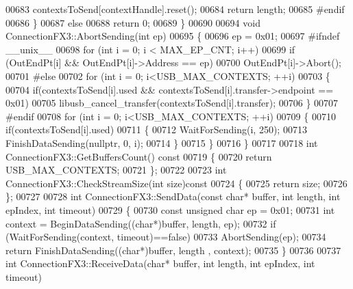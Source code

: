 \begin{DoxyCode}
{{{{00683         contextsToSend[contextHandle].reset();
00684     \textcolor{keywordflow}{return} length;
00685 \textcolor{preprocessor}{#endif}
00686     \}
00687     \textcolor{keywordflow}{else}
00688         \textcolor{keywordflow}{return} 0;
00689 \}
00690 
00694 \textcolor{keywordtype}{void} ConnectionFX3::AbortSending(\textcolor{keywordtype}{int} ep)
00695 \{
00696     ep = 0x01;
00697 \textcolor{preprocessor}{#ifndef \_\_unix\_\_}
00698     \textcolor{keywordflow}{for} (\textcolor{keywordtype}{int} i = 0; i < MAX\_EP\_CNT; i++)
00699         \textcolor{keywordflow}{if} (OutEndPt[i] && OutEndPt[i]->Address == ep)
00700             OutEndPt[i]->Abort();
00701 \textcolor{preprocessor}{#else}
00702     \textcolor{keywordflow}{for} (\textcolor{keywordtype}{int} i = 0; i<USB\_MAX\_CONTEXTS; ++i)
00703     \{
00704         \textcolor{keywordflow}{if}(contextsToSend[i].used && contextsToSend[i].transfer->endpoint == 0x01)
00705             libusb\_cancel\_transfer(contextsToSend[i].transfer);
00706     \}
00707 \textcolor{preprocessor}{#endif}
00708     \textcolor{keywordflow}{for} (\textcolor{keywordtype}{int} i = 0; i<USB\_MAX\_CONTEXTS; ++i)
00709     \{
00710         \textcolor{keywordflow}{if}(contextsToSend[i].used)
00711         \{
00712             WaitForSending(i, 250);
00713             FinishDataSending(\textcolor{keyword}{nullptr}, 0, i);
00714         \}
00715     \}
00716 \}
00717 
00718 \textcolor{keywordtype}{int} ConnectionFX3::GetBuffersCount()\textcolor{keyword}{ const}
00719 \textcolor{keyword}{}\{
00720     \textcolor{keywordflow}{return} USB\_MAX\_CONTEXTS;
00721 \};
00722 
00723 \textcolor{keywordtype}{int} ConnectionFX3::CheckStreamSize(\textcolor{keywordtype}{int} size)\textcolor{keyword}{const}
00724 \textcolor{keyword}{}\{
00725     \textcolor{keywordflow}{return} size;
00726 \};
00727 
00728 \textcolor{keywordtype}{int} ConnectionFX3::SendData(\textcolor{keyword}{const} \textcolor{keywordtype}{char}* buffer, \textcolor{keywordtype}{int} length, \textcolor{keywordtype}{int} epIndex, \textcolor{keywordtype}{int} timeout)
00729 \{
00730     \textcolor{keyword}{const} \textcolor{keywordtype}{unsigned} \textcolor{keywordtype}{char} ep = 0x01;
00731     \textcolor{keywordtype}{int} context = BeginDataSending((\textcolor{keywordtype}{char}*)buffer, length, ep);
00732     \textcolor{keywordflow}{if} (WaitForSending(context, timeout)==\textcolor{keyword}{false})
00733         AbortSending(ep);
00734     \textcolor{keywordflow}{return} FinishDataSending((\textcolor{keywordtype}{char}*)buffer, length , context);
00735 \}
00736 
00737 \textcolor{keywordtype}{int} ConnectionFX3::ReceiveData(\textcolor{keywordtype}{char}* buffer, \textcolor{keywordtype}{int} length, \textcolor{keywordtype}{int} epIndex, \textcolor{keywordtype}{int} timeout)
}}}}
\end{DoxyCode}
